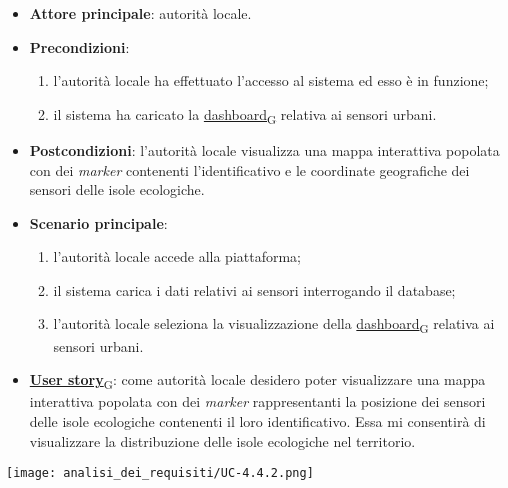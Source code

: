 \newpage
{}
\begin{itemize}
	\item \textbf{Attore principale}: autorità locale.
	\item \textbf{Precondizioni}:
	      \begin{enumerate}
		      \item l'autorità locale ha effettuato l'accesso al sistema ed esso è in funzione;
		      \item il sistema ha caricato la \href{https://7last.github.io/docs/pb/documentazione-interna/glossario\#dashboard}{dashboard\textsubscript{G}} relativa ai sensori urbani.
	      \end{enumerate}
	\item \textbf{Postcondizioni}: l'autorità locale visualizza una mappa interattiva popolata con dei \textit{marker} contenenti l'identificativo e le coordinate geografiche dei sensori delle isole ecologiche.
	\item \textbf{Scenario principale}:
	      \begin{enumerate}
		      \item l'autorità locale accede alla piattaforma;
		      \item il sistema carica i dati relativi ai sensori interrogando il database;
		      \item l'autorità locale seleziona la visualizzazione della \href{https://7last.github.io/docs/pb/documentazione-interna/glossario\#dashboard}{dashboard\textsubscript{G}} relativa ai sensori urbani.
	      \end{enumerate}
	\item \href{https://7last.github.io/docs/pb/documentazione-interna/glossario\#user-story}{\textbf{User story}\textsubscript{G}}:
	      come autorità locale desidero poter visualizzare una mappa interattiva popolata con dei \textit{marker} rappresentanti la posizione dei sensori delle isole ecologiche
	      contenenti il loro identificativo. Essa mi consentirà di visualizzare la distribuzione delle isole ecologiche nel territorio.
\end{itemize}
\begin{center}
	\texttt{[image: analisi\_dei\_requisiti/UC-4.4.2.png]}
\end{center}

